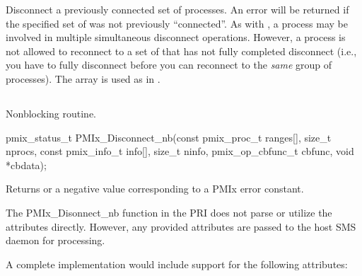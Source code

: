
\descr

Disconnect a previously connected set of processes.
An error will be returned if the specified set of  was not previously ``connected''.
As with , a process may be involved in multiple simultaneous disconnect operations.
However, a process is not allowed to reconnect to a set of  that has not fully completed disconnect (i.e., you have to fully disconnect before you can reconnect to the \emph{same} group of processes).
The  array is used as in .


\subsection{}

\summary

Nonblocking  routine.

\format

\cspecificstart
\begin{codepar}
pmix_status_t
PMIx_Disconnect_nb(const pmix_proc_t ranges[], size_t nprocs,
                   const pmix_info_t info[], size_t ninfo,
                   pmix_op_cbfunc_t cbfunc, void *cbdata);
\end{codepar}
\cspecificend

\begin{arglist}
\end{arglist}

Returns  or a negative value corresponding to a PMIx error constant.

\priattr
The PMIx_Disonnect_nb function in the \ac{PRI} does not parse or utilize the attributes directly. However, any provided attributes are passed to the host \ac{SMS} daemon for processing.

\optattr
A complete implementation would include support for the following attributes:

